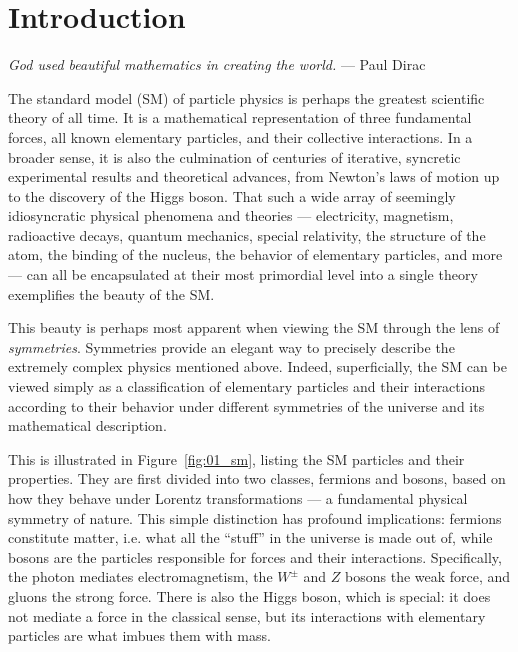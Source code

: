 
\chapter{Introduction}
\label{sec:01_intro}

\begin{center}
	\centering
	\noindent
	\textit{God used beautiful mathematics in creating the world.} --- Paul Dirac~\cite{pagels2012cosmic}
\end{center}

\baselineskip

The standard model (SM) of particle physics is perhaps the greatest scientific theory of all time.
It is a mathematical representation of three fundamental forces, all known elementary particles, and their collective interactions.
In a broader sense, it is also the culmination of centuries of iterative, syncretic experimental results and theoretical advances, from Newton's laws of motion up to the discovery of the Higgs boson.
That such a wide array of seemingly idiosyncratic physical phenomena and theories --- electricity, magnetism, radioactive decays, quantum mechanics, special relativity, the structure of the atom, the binding of the nucleus, the behavior of elementary particles, and more --- can all be encapsulated at their most primordial level into a single theory exemplifies the beauty of the SM.

This beauty is perhaps most apparent when viewing the SM through the lens of \textit{symmetries}.
Symmetries provide an elegant way to precisely describe the extremely complex physics mentioned above. 
Indeed, superficially, the SM can be viewed simply as a classification of elementary particles and their interactions according to their behavior under different symmetries of the universe and its mathematical description.

This is illustrated in Figure~\ref{fig:01_sm}, listing the SM particles and their properties.
They are first divided into two classes, fermions and bosons, based on how they behave under Lorentz transformations --- a fundamental physical symmetry of nature.
This simple distinction has profound implications: fermions constitute matter, i.e. what all the ``stuff'' in the universe is made out of, while bosons are the particles responsible for forces and their interactions.
Specifically, the photon mediates electromagnetism, the $W^{\pm}$ and $Z$ bosons the weak force, and gluons the strong force.
There is also the Higgs boson, which is special: it does not mediate a force in the classical sense, but its interactions with elementary particles are what imbues them with mass.

